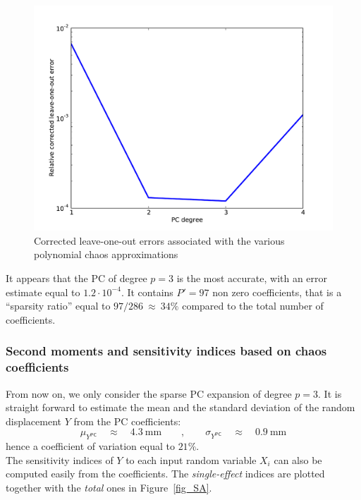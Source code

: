 \documentclass[11pt]{article}
\begin{document}
\begin{figure}[Hhbtp] 
  \begin{center}
    \includegraphics[width=12cm]{Truss_errors.pdf}
  \end{center} 
  \caption{Corrected leave-one-out errors associated with the various polynomial chaos approximations}
\label{fig_errors}
\end{figure}

It appears that the PC of degree $p=3$ is the most accurate, with an error estimate equal to $1.2 \cdot 10^{-4}$. It contains $P'=97$ non zero coefficients, that is a ``sparsity ratio'' equal to $97 / 286~\approx~ 34\%$ compared to the total number of coefficients. 

\subsubsection{Second moments and sensitivity indices based on chaos coefficients}

From now on, we only consider the sparse PC expansion of degree $p=3$. It is straight forward to estimate the mean and the standard deviation of the random displacement $Y$ from the PC coefficients:
\begin{equation}
 \mu_{Y^\textsf{PC}} \quad \approx \quad 4.3~\mbox{mm} \qquad , \qquad \sigma_{Y^\textsf{PC}} \quad \approx \quad 0.9~\mbox{mm}
\end{equation}
hence a coefficient of variation equal to $21\%$. \\

The sensitivity indices of $Y$ to each input random variable $X_i$ can also be computed easily from the coefficients. The \emph{single-effect} indices are plotted together with the \emph{total} ones in Figure~\ref{fig_SA}.  
\end{document}
